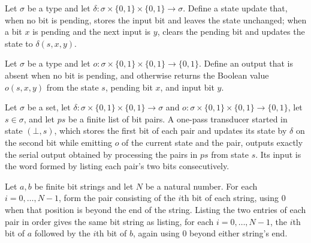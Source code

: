 \begin{definition}
\leanok
Let $\sigma$ be a type and let $\delta : \sigma \times \{0,1\} \times \{0,1\} \to
\sigma$. Define a state update that, when no bit is pending, stores the input bit and
leaves the state unchanged; when a bit $x$ is pending and the next input is $y$, clears
the pending bit and updates the state to $\delta(s,x,y)$.
\end{definition}

\begin{definition}
\label{Complexity.BinArith.pairO}
\leanok
Let $\sigma$ be a type and let $o : \sigma \times \{0,1\} \times \{0,1\} \to \{0,1\}$.
Define an output that is absent when no bit is pending, and otherwise returns the
Boolean value $o(s,x,y)$ from the state $s$, pending bit $x$, and input bit $y$.
\end{definition}

\begin{theorem}
\label{Complexity.BinArith.transduce_pairs}
\leanok
{}
Let $\sigma$ be a set, let $\delta : \sigma \times \{0,1\} \times \{0,1\} \to \sigma$
and $o : \sigma \times \{0,1\} \times \{0,1\} \to \{0,1\}$, let $s \in \sigma$, and let
$ps$ be a finite list of bit pairs. A one-pass transducer started in state $(\bot,s)$,
which stores the first bit of each pair and updates its state by $\delta$ on the second
bit while emitting $o$ of the current state and the pair, outputs exactly the serial
output obtained by processing the pairs in $ps$ from state $s$. Its input is the word
formed by listing each pair's two bits consecutively.
\end{theorem}

\begin{theorem}
\label{Complexity.BinArith.flatMap_zipChunk}
\leanok
{}
Let $a,b$ be finite bit strings and let $N$ be a natural number. For each
$i=0,\ldots,N-1$, form the pair consisting of the $i$th bit of each string, using $0$
when that position is beyond the end of the string. Listing the two entries of each pair
in order gives the same bit string as listing, for each $i=0,\ldots,N-1$, the $i$th bit
of $a$ followed by the $i$th bit of $b$, again using $0$ beyond either string's end.
\end{theorem}

